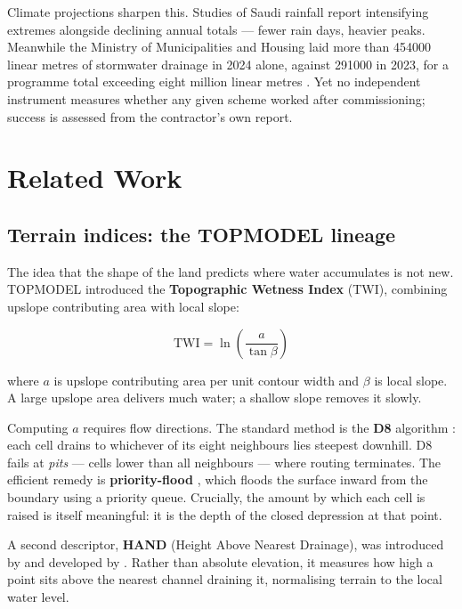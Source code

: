 \documentclass[11pt,a4paper]{article}
\begin{document}
Climate projections sharpen this. Studies of Saudi rainfall report intensifying extremes
alongside declining annual totals \citep{almazroui2020,escwa2017} --- fewer rain days,
heavier peaks. Meanwhile the Ministry of Municipalities and Housing laid more than
\num{454000} linear metres of stormwater drainage in 2024 alone, against \num{291000} in
2023, for a programme total exceeding eight million linear metres \citep{momah2025}. Yet
no independent instrument measures whether any given scheme worked after commissioning;
success is assessed from the contractor's own report.

\section{Related Work}\label{sec:related}

\subsection{Terrain indices: the TOPMODEL lineage}
The idea that the shape of the land predicts where water accumulates is not new.
TOPMODEL \citep{beven1979} introduced the \textbf{Topographic Wetness Index} (TWI),
combining upslope contributing area with local slope:

\begin{equation}
\mathrm{TWI} = \ln\!\left(\frac{a}{\tan\beta}\right)
\label{eq:twi}
\end{equation}

\noindent where $a$ is upslope contributing area per unit contour width and $\beta$ is
local slope. A large upslope area delivers much water; a shallow slope removes it slowly.

Computing $a$ requires flow directions. The standard method is the \textbf{D8} algorithm
\citep{ocallaghan1984}: each cell drains to whichever of its eight neighbours lies
steepest downhill. D8 fails at \emph{pits} --- cells lower than all neighbours --- where
routing terminates. The efficient remedy is \textbf{priority-flood}
\citep{barnes2014}, which floods the surface inward from the boundary using a priority
queue. Crucially, the amount by which each cell is raised is itself meaningful: it is the
depth of the closed depression at that point.

A second descriptor, \textbf{HAND} (Height Above Nearest Drainage), was introduced by
\citet{renno2008} and developed by \citet{nobre2011}. Rather than absolute elevation, it
measures how high a point sits above the nearest channel draining it, normalising terrain
to the local water level.
\end{document}
